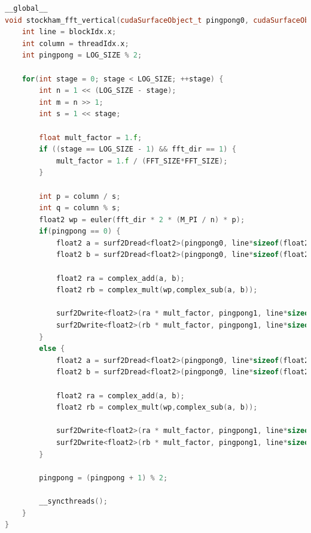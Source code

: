 \documentclass[
  oneside,
  11pt, a4paper,
  footinclude=true,
  headinclude=true,
  cleardoublepage=empty
]{scrbook}
\begin{document}
\begin{lstlisting}[language=C++,caption={FFT Radix-2 Stockham, see \autoref{sec:implementation-analysis-in-cuda}},label={lst:cuda-radix2-stockham}]
__global__
void stockham_fft_vertical(cudaSurfaceObject_t pingpong0, cudaSurfaceObject_t pingpong1, float fft_dir) {
    int line = blockIdx.x;
    int column = threadIdx.x;
    int pingpong = LOG_SIZE % 2;

    for(int stage = 0; stage < LOG_SIZE; ++stage) {
        int n = 1 << (LOG_SIZE - stage);
        int m = n >> 1;
        int s = 1 << stage;

        float mult_factor = 1.f;
	    if ((stage == LOG_SIZE - 1) && fft_dir == 1) {
	    	mult_factor = 1.f / (FFT_SIZE*FFT_SIZE);
	    }

        int p = column / s;
        int q = column % s;
        float2 wp = euler(fft_dir * 2 * (M_PI / n) * p);
        if(pingpong == 0) {
            float2 a = surf2Dread<float2>(pingpong0, line*sizeof(float2), (q + s*(p + 0)));
            float2 b = surf2Dread<float2>(pingpong0, line*sizeof(float2), (q + s*(p + m)));

            float2 ra = complex_add(a, b);
            float2 rb = complex_mult(wp,complex_sub(a, b));
            
            surf2Dwrite<float2>(ra * mult_factor, pingpong1, line*sizeof(float2), (q + s*(2*p + 0)));
            surf2Dwrite<float2>(rb * mult_factor, pingpong1, line*sizeof(float2), (q + s*(2*p + 1)));
        }
        else {
            float2 a = surf2Dread<float2>(pingpong0, line*sizeof(float2), (q + s*(p + 0)));
            float2 b = surf2Dread<float2>(pingpong0, line*sizeof(float2), (q + s*(p + m)));

            float2 ra = complex_add(a, b);
            float2 rb = complex_mult(wp,complex_sub(a, b));
            
            surf2Dwrite<float2>(ra * mult_factor, pingpong1, line*sizeof(float2), (q + s*(2*p + 0)));
            surf2Dwrite<float2>(rb * mult_factor, pingpong1, line*sizeof(float2), (q + s*(2*p + 1)));
        }

        pingpong = (pingpong + 1) % 2;

        __syncthreads();
    }
}
\end{lstlisting}
\end{document}
